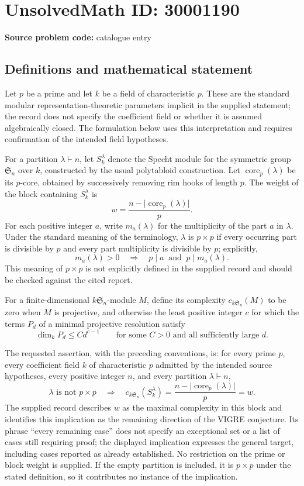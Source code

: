 \documentclass[11pt]{article}
\begin{document}
\section*{UnsolvedMath ID: 30001190}
\textbf{Source problem code:} catalogue entry
\subsection{Definitions and mathematical statement}
Let \(p\) be a prime and let \(k\) be a field of characteristic \(p\). These are the standard modular representation-theoretic parameters implicit in the supplied statement; the record does not specify the coefficient field or whether it is assumed algebraically closed. The formulation below uses this interpretation and requires confirmation of the intended field hypotheses.

For a partition \(\lambda\vdash n\), let \(S_k^\lambda\) denote the Specht module for the symmetric group \(\mathfrak S_n\) over \(k\), constructed by the usual polytabloid construction. Let \(\operatorname{core}_p(\lambda)\) be its \(p\)-core, obtained by successively removing rim hooks of length \(p\). The weight of the block containing \(S_k^\lambda\) is
\[
 w=\frac{n-\lvert\operatorname{core}_p(\lambda)\rvert}{p}.
\]
For each positive integer \(a\), write \(m_a(\lambda)\) for the multiplicity of the part \(a\) in \(\lambda\). Under the standard meaning of the terminology, \(\lambda\) is \(p\times p\) if every occurring part is divisible by \(p\) and every part multiplicity is divisible by \(p\); explicitly,
\[
 m_a(\lambda)>0\quad\Longrightarrow\quad p\mid a\ \text{ and }\ p\mid m_a(\lambda).
\]
This meaning of \(p\times p\) is not explicitly defined in the supplied record and should be checked against the cited report.

For a finite-dimensional \(k\mathfrak S_n\)-module \(M\), define its complexity \(c_{k\mathfrak S_n}(M)\) to be zero when \(M\) is projective, and otherwise the least positive integer \(c\) for which the terms \(P_d\) of a minimal projective resolution satisfy
\[
 \dim_k P_d\leq C d^{c-1}
 \qquad\text{for some }C>0\text{ and all sufficiently large }d.
\]

The requested assertion, with the preceding conventions, is: for every prime \(p\), every coefficient field \(k\) of characteristic \(p\) admitted by the intended source hypotheses, every positive integer \(n\), and every partition \(\lambda\vdash n\),
\[
 \lambda\text{ is not }p\times p
 \quad\Longrightarrow\quad
 c_{k\mathfrak S_n}(S_k^\lambda)
 =\frac{n-\lvert\operatorname{core}_p(\lambda)\rvert}{p}
 =w.
\]
The supplied record describes \(w\) as the maximal complexity in this block and identifies this implication as the remaining direction of the VIGRE conjecture. Its phrase ``every remaining case'' does not specify an exceptional set or a list of cases still requiring proof; the displayed implication expresses the general target, including cases reported as already established. No restriction on the prime or block weight is supplied. If the empty partition is included, it is \(p\times p\) under the stated definition, so it contributes no instance of the implication.
\end{document}
